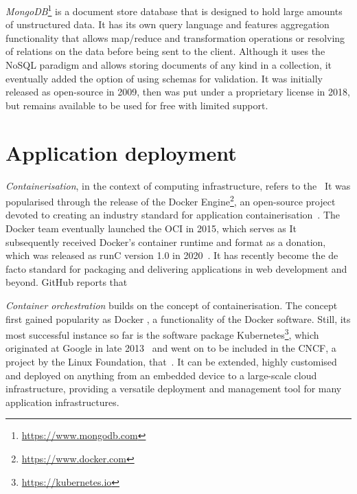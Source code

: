\emph{MongoDB}\footnote{\url{https://www.mongodb.com}} is a document store database that is designed to hold large amounts of unstructured data.
It has its own query language and features aggregation functionality that allows map/reduce and transformation operations or resolving of relations on the data before being sent to the client.
Although it uses the \ac{NoSQL} paradigm and allows storing documents of any kind in a collection, it eventually added the option of using schemas for validation.
It was initially released as open-source in 2009, then was put under a proprietary license in 2018, but remains available to be used for free with limited support.

\section{Application deployment}
\label{sec:application-deployment}

\emph{Containerisation}, in the context of computing infrastructure, refers to the~ It was popularised through the release of the Docker Engine\footnote{\url{https://www.docker.com}}, an open-source project devoted to creating an industry standard for application containerisation~\parencite{dockerRelease}.
The Docker team eventually launched the \ac{OCI} in 2015, which serves as  It subsequently received Docker's container runtime and format as a donation, which was released as runC version 1.0 in 2020~\parencite{openContainerInitiative}.
It has recently become the de facto standard for packaging and delivering applications in web development and beyond.
GitHub reports that~

\emph{Container orchestration} builds on the concept of containerisation.  The concept first gained popularity as Docker , a functionality of the Docker software. Still, its most successful instance so far is the software package Kubernetes\footnote{\url{https://kubernetes.io}}, which originated at Google in late 2013~\parencite{kubernetesHistory} and went on to be included in the \ac{CNCF}, a project by the Linux Foundation, that~.
It can be extended, highly customised and deployed on anything from an embedded device to a large-scale cloud infrastructure, providing a versatile deployment and management tool for many application infrastructures.
